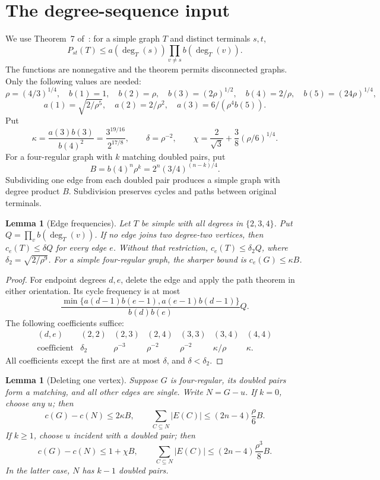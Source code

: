 \documentclass[11pt]{article}
\newtheorem{lemma}[theorem]{Lemma}
\begin{document}
\section{The degree-sequence input}

We use Theorem~7 of~\cite{dmnnp}:
for a simple graph $T$ and distinct terminals $s,t$,
\[
 P_{st}(T)\le a(\deg_T(s))\prod_{v\ne s}b(\deg_T(v)).
\]
The functions are nonnegative and the theorem permits disconnected graphs.
Only the following values are needed:
\[
 \rho=(4/3)^{1/4},\quad b(1)=1,\quad b(2)=\rho,\quad
 b(3)=(2\rho)^{1/2},\quad b(4)=2/\rho,\quad b(5)=(24\rho)^{1/4},
\]
\[
 a(1)=\sqrt{2/\rho^5},\quad a(2)=2/\rho^2,\quad a(3)=6/(\rho^4b(5)).
\]
Put
\[
 \kappa=\frac{a(3)b(3)}{b(4)^2}=\frac{3^{19/16}}{2^{17/8}},\qquad
 \delta=\rho^{-2},\qquad
 \chi=\frac2{\sqrt3}+\frac38(\rho/6)^{1/4}.
\]
For a four-regular graph with $k$ matching doubled pairs, put
\[
 B=b(4)^n\rho^k=2^n(3/4)^{(n-k)/4}.
\]
Subdividing one edge from each doubled pair produces a simple graph with degree product $B$.
Subdivision preserves cycles and paths between original terminals.

\begin{lemma}[Edge frequencies]\label{lem:frequency}
Let $T$ be simple with all degrees in $\{2,3,4\}$.
Put $Q=\prod_vb(\deg_T(v))$.
If no edge joins two degree-two vertices, then $c_e(T)\le\delta Q$ for every edge $e$.
Without that restriction, $c_e(T)\le\delta_2Q$, where $\delta_2=\sqrt{2/\rho^9}$.
For a simple four-regular graph, the sharper bound is $c_e(G)\le\kappa B$.
\end{lemma}

\begin{proof}
For endpoint degrees $d,e$, delete the edge and apply the path theorem in either orientation.
Its cycle frequency is at most
\[
 \frac{\min\{a(d-1)b(e-1),a(e-1)b(d-1)\}}{b(d)b(e)}Q.
\]
The following coefficients suffice:
\[
\begin{array}{c|rrrrrr}
(d,e)&(2,2)&(2,3)&(2,4)&(3,3)&(3,4)&(4,4)\\\hline
\text{coefficient}&\delta_2&\rho^{-3}&\rho^{-2}&\rho^{-2}&\kappa/\rho&\kappa.
\end{array}
\]
All coefficients except the first are at most $\delta$, and $\delta<\delta_2$.
\end{proof}

\begin{lemma}[Deleting one vertex]\label{lem:deletion}
Suppose $G$ is four-regular, its doubled pairs form a matching, and all other edges are single.
Write $N=G-u$.
If $k=0$, choose any $u$; then
\[
 c(G)-c(N)\le2\kappa B,\qquad
 \sum_{C\subseteq N}|E(C)|\le(2n-4)\frac\rho6B.
\]
If $k\ge1$, choose $u$ incident with a doubled pair; then
\[
 c(G)-c(N)\le1+\chi B,\qquad
 \sum_{C\subseteq N}|E(C)|\le(2n-4)\frac{\rho^3}{8}B.
\]
In the latter case, $N$ has $k-1$ doubled pairs.
\end{lemma}
\end{document}
